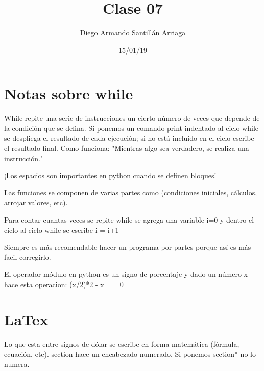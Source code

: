 \documentclass[letterpaper, 12pt, oneside]{article}%
\title{\Huge Clase 07}
\author{Diego Armando Santillán Arriaga}
\date{15/01/19}
\begin{document}
	\maketitle
	\newpage
	\section{Notas sobre while}
	While repite una serie de instrucciones un cierto número de veces que depende de la condición que se defina. Si ponemos un comando print indentado al ciclo while se despliega el resultado de cada ejecución; si no está incluido en el ciclo escribe el resultado final. 
	Como funciona:
	"Mientras algo sea verdadero, se realiza una instrucción."
	
	¡Los espacios son importantes en python cuando se definen bloques!
	
	Las funciones se componen de varias partes como (condiciones iniciales, cálculos, arrojar valores, etc).
	
	Para contar cuantas veces se repite while se agrega una variable i=0 y dentro el ciclo al ciclo while se escribe i = i+1
	
	Siempre es más recomendable hacer un programa por partes porque así es más facil corregirlo.
	
	El operador módulo en python es un signo de porcentaje y dado un número x hace esta operacion: (x/2)*2 - x == 0 
	
	\section{LaTex}
	Lo que esta entre signos de dólar se escribe en forma matemática (fórmula, ecuación, etc).
	section hace un encabezado numerado. Si ponemos section* no lo numera. 
\end{document}
